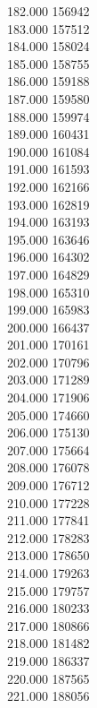 { 182.000	156942 \\
 183.000	157512 \\
 184.000	158024 \\
 185.000	158755 \\
 186.000	159188 \\
 187.000	159580 \\
 188.000	159974 \\
 189.000	160431 \\
 190.000	161084 \\
 191.000	161593 \\
 192.000	162166 \\
 193.000	162819 \\
 194.000	163193 \\
 195.000	163646 \\
 196.000	164302 \\
 197.000	164829 \\
 198.000	165310 \\
 199.000	165983 \\
 200.000	166437 \\
 201.000	170161 \\
 202.000	170796 \\
 203.000	171289 \\
 204.000	171906 \\
 205.000	174660 \\
 206.000	175130 \\
 207.000	175664 \\
 208.000	176078 \\
 209.000	176712 \\
 210.000	177228 \\
 211.000	177841 \\
 212.000	178283 \\
 213.000	178650 \\
 214.000	179263 \\
 215.000	179757 \\
 216.000	180233 \\
 217.000	180866 \\
 218.000	181482 \\
 219.000	186337 \\
 220.000	187565 \\
 221.000	188056 \\
}
